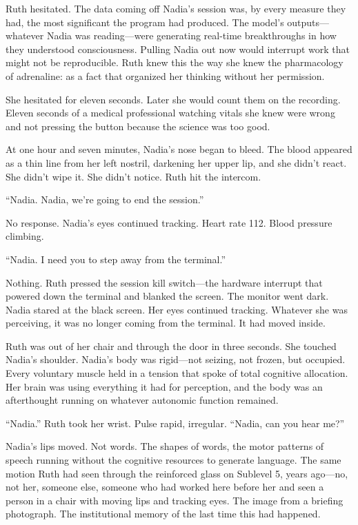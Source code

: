 Ruth hesitated. The data coming off Nadia's session was, by every measure they had, the most significant the program had produced. The model's outputs---whatever Nadia was reading---were generating real-time breakthroughs in how they understood consciousness. Pulling Nadia out now would interrupt work that might not be reproducible. Ruth knew this the way she knew the pharmacology of adrenaline: as a fact that organized her thinking without her permission.

She hesitated for eleven seconds. Later she would count them on the recording. Eleven seconds of a medical professional watching vitals she knew were wrong and not pressing the button because the science was too good.

At one hour and seven minutes, Nadia's nose began to bleed. The blood appeared as a thin line from her left nostril, darkening her upper lip, and she didn't react. She didn't wipe it. She didn't notice. Ruth hit the intercom.

``Nadia. Nadia, we're going to end the session.''

No response. Nadia's eyes continued tracking. Heart rate 112. Blood pressure climbing.

``Nadia. I need you to step away from the terminal.''

Nothing. Ruth pressed the session kill switch---the hardware interrupt that powered down the terminal and blanked the screen. The monitor went dark. Nadia stared at the black screen. Her eyes continued tracking. Whatever she was perceiving, it was no longer coming from the terminal. It had moved inside.

Ruth was out of her chair and through the door in three seconds. She touched Nadia's shoulder. Nadia's body was rigid---not seizing, not frozen, but occupied. Every voluntary muscle held in a tension that spoke of total cognitive allocation. Her brain was using everything it had for perception, and the body was an afterthought running on whatever autonomic function remained.

``Nadia.'' Ruth took her wrist. Pulse rapid, irregular. ``Nadia, can you hear me?''

Nadia's lips moved. Not words. The shapes of words, the motor patterns of speech running without the cognitive resources to generate language. The same motion Ruth had seen through the reinforced glass on Sublevel 5, years ago---no, not her, someone else, someone who had worked here before her and seen a person in a chair with moving lips and tracking eyes. The image from a briefing photograph. The institutional memory of the last time this had happened.

